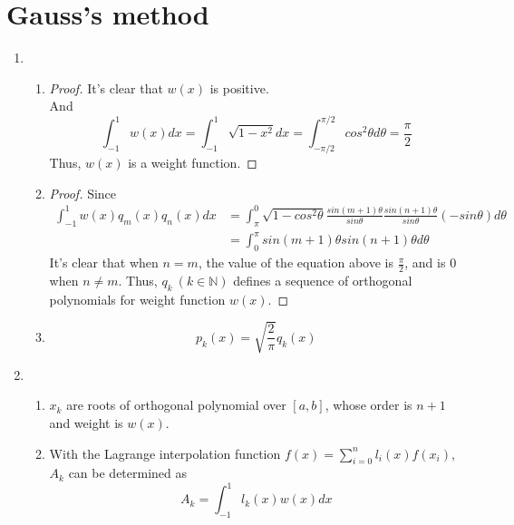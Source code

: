 \documentclass[paper=a4, fontsize=11pt]{scrartcl} %
\numberwithin{equation}{section} %
\numberwithin{figure}{section} %
\numberwithin{table}{section} %
\begin{document}
\section{Gauss's method}
\begin{enumerate}
	\item 
		\begin{enumerate}
			\item 
				\begin{proof}
					It's clear that $w(x)$ is positive.\\
					And
					\begin{equation}
						\int_{-1}^{1} w(x) dx = \int_{-1}^{1} \sqrt{1-x^2}dx = \int_{-\pi/2}^{\pi/2} cos^2\theta d\theta = \frac{\pi}{2}
					\end{equation}
					Thus, $w(x)$ is a weight function.
				\end{proof}
			\item 
				\begin{proof}
					Since
					\begin{equation}
						\begin{aligned}
							\int_{-1}^{1}w(x)q_m(x)q_n(x)dx 
							& = \int_{\pi}^{0} \sqrt{1-cos^2\theta} \frac{sin(m+1)\theta}{sin\theta} \frac{sin(n+1)\theta}{sin\theta}(-sin\theta)d\theta\\
							& = \int_{0}^{\pi} sin(m+1)\theta sin(n+1)\theta d\theta
						\end{aligned}
					\end{equation}
					It's clear that when $n=m$, the value of the equation above is $\frac{\pi}{2}$, and is $0$ when $n \neq m$.
					Thus, $q_k\  (k\in \mathbb{N})$ defines a sequence of orthogonal polynomials for weight function $w(x)$.
				\end{proof}
			\item
				\begin{equation}
					p_k(x) = \sqrt{\frac{2}{\pi}} q_k(x)
				\end{equation} 
		\end{enumerate}
	\item 
		\begin{enumerate}
			\item 
				$x_k$ are roots of orthogonal polynomial over $[a, b]$, whose order is $n+1$ and weight is $w(x)$.
			\item 
				With the Lagrange interpolation function $f(x) = \sum_{i=0}^{n} l_i(x)f(x_i)$, $A_k$ can be determined as
				\begin{equation}
					A_k = \int_{-1}^{1} l_k(x)w(x)dx
				\end{equation}

\end{enumerate}
\end{enumerate}
\end{document}
